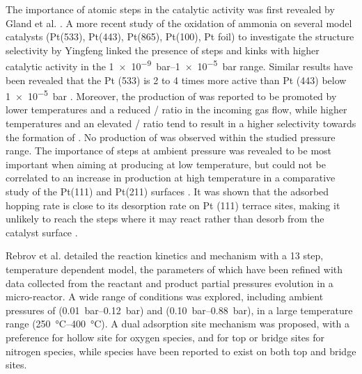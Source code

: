 The importance of atomic steps in the catalytic activity was first revealed by Gland et al. \parencite*{Gland1978, Gland1980}.
A more recent study of the oxidation of ammonia on several model catalysts (Pt(533), Pt(443), Pt(865), Pt(100), Pt foil) to investigate the structure selectivity by Yingfeng \parencite*{Yingfeng2008} linked the presence of steps and kinks with higher catalytic activity in the \qtyrange{1e-9}{1e-5}{\bar} range.
Similar results have been revealed that the Pt (533) is 2 to 4 times more active than Pt (443) below \qty{1e-5}{\bar} \parencite{Scheibe2005}.
Moreover, the production of  was reported to be promoted by lower temperatures and a reduced / ratio in the incoming gas flow, while higher temperatures and an elevated / ratio tend to result in a higher selectivity towards the formation of  \parencite{Zeng2009}.
No production of  was observed within the studied pressure range.
The importance of steps at ambient pressure was revealed to be most important when aiming at producing  at low temperature, but could not be correlated to an increase in  production at high temperature in a comparative study of the Pt(111) and Pt(211) surfaces \parencite{Ma2019}.
It was shown that the adsorbed  hopping rate is close to its desorption rate on Pt (111) terrace sites, making it unlikely to reach the steps where it may react rather than desorb from the catalyst surface \parencite{Borodin2021}.

Rebrov et al. \parencite*{Rebrov2002} detailed the reaction kinetics and mechanism with a 13 step, temperature dependent model, the parameters of which have been refined with data collected from the reactant and product partial pressures evolution in a micro-reactor.
A wide range of conditions was explored, including ambient pressures of  (\qtyrange{0.01}{0.12}{\bar}) and  (\qtyrange{0.10}{0.88}{\bar}), in a large temperature range (\qtyrange{250}{400}{\degreeCelsius}).
A dual adsorption site mechanism was proposed, with a preference for hollow site for oxygen species, and for top or bridge sites for nitrogen species, while  species have been reported to exist on both top and bridge sites.

